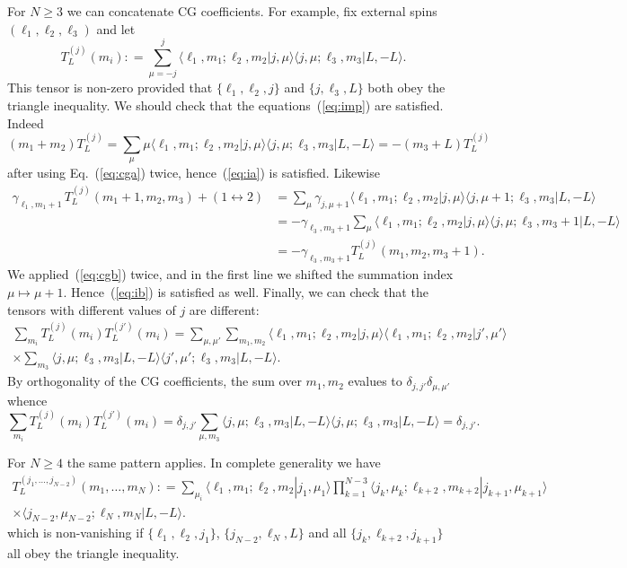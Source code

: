 \documentclass[10pt]{article}
\theoremstyle{plain}
\theoremstyle{remark}
\def\lra{\leftrightarrow}
\newcommand{\brakket}[2]{\langle #1|#2\rangle}
\def\ldef{\mathrel{\mathop:}=}
\newcommand{\reef}[1]{(\ref{#1})}
\def\beq{\begin{equation}}
\def\eeq{\end{equation}}
\def\ga{\gamma}
\def\l{\ell}
\begin{document}
For $N\geq 3$ we can concatenate CG coefficients. For example, fix external spins $(\l_1,\l_2,\l_3)$ and let
\beq
T^{(j)}_L(m_i) \ldef \sum_{\mu = -j}^j \brakket{\l_1,m_1;\l_2,m_2}{j,\mu} \brakket{j,\mu;\l_3,m_3}{L,-L}.
\eeq
This tensor is non-zero provided that $\{\l_1,\l_2,j\}$ and $\{j,\l_3,L\}$ both obey the triangle inequality. We should check that the equations~\reef{eq:imp} are satisfied.
Indeed
\beq
(m_1 + m_2)  T^{(j)}_L = \sum_\mu \mu  \brakket{\l_1,m_1;\l_2,m_2}{j,\mu} \brakket{j,\mu;\l_3,m_3}{L,-L} = -(m_3 + L) T^{(j)}_L
\eeq
after using Eq.~\reef{eq:cga} twice, hence~\reef{eq:ia} is satisfied. Likewise
\begin{align*}
  \ga_{\l_1,m_1+1} \, T^{(j)}_L(m_1+1,m_2,m_3) + (1 \lra 2) &= \sum_\mu \ga_{j,\mu+1} \brakket{\l_1,m_1;\l_2,m_2}{j,\mu} \brakket{j,\mu+1;\l_3,m_3}{L,-L}\\
  &=- \ga_{\l_3,m_3+1}  \sum_\mu  \brakket{\l_1,m_1;\l_2,m_2}{j,\mu} \brakket{j,\mu;\l_3,m_3+1}{L,-L}\\
  &= - \ga_{\l_3,m_3+1} T^{(j)}_L(m_1,m_2,m_3+1).
\end{align*}
We applied~\reef{eq:cgb} twice, and in the first line we shifted the summation index $\mu \mapsto \mu + 1$. Hence~\reef{eq:ib} is satisfied as well. Finally, we can check that the tensors with different values of $j$ are different:
\begin{multline}
  \sum_{m_i} T^{(j)}_L(m_i) T^{(j')}_L(m_i) = \sum_{\mu,\mu'} \sum_{m_1,m_2} \brakket{\l_1,m_1;\l_2,m_2}{j,\mu}\brakket{\l_1,m_1;\l_2,m_2}{j',\mu'}  \\
  \times \sum_{m_3} \brakket{j,\mu;\l_3,m_3}{L,-L} \brakket{j',\mu';\l_3,m_3}{L,-L}.
\end{multline}
By orthogonality of the CG coefficients, the sum over $m_1,m_2$ evalues to $\delta_{j,j'} \delta_{\mu,\mu'}$ whence
\beq
\sum_{m_i} T^{(j)}_L(m_i) T^{(j')}_L(m_i) = \delta_{j,j'} \sum_{\mu,m_3}\brakket{j,\mu;\l_3,m_3}{L,-L} \brakket{j,\mu;\l_3,m_3}{L,-L} = \delta_{j,j'}.
\eeq

For $N \geq 4$ the same pattern applies. In complete generality we have
\begin{multline}
  T^{(j_1,\ldots,j_{N-2})}_L(m_1,\ldots,m_N) \ldef \sum_{\mu_i} \brakket{\l_1,m_1;\l_2,m_2}{j_1,\mu_1} \prod_{k=1}^{N-3} \brakket{j_k,\mu_k;\l_{k+2},m_{k+2}}{j_{k+1},\mu_{k+1}} \\
  \times \brakket{j_{N-2},\mu_{N-2};\l_N,m_N}{L,-L}.
\end{multline}
which is non-vanishing if $\{\l_1,\l_2,j_1\}$, $\{j_{N-2},\l_N,L\}$ and all $\{j_k,\l_{k+2},j_{k+1}\}$ all obey the triangle inequality. 



  { 


  }
  
\end{document}
